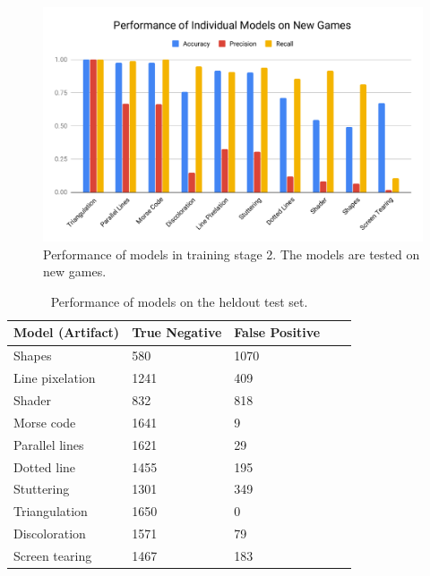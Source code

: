 \begin{figure}
    \centering
    \includegraphics[scale=0.7]{images/stage2fig.pdf}
    \caption[Performance of models in training stage 2]{Performance of models in training stage 2. The models are tested on new games.}
    \label{fig:stage2}
\end{figure}



\begin{table}
\centering
\begin{tabular}{@{}lllll@{}}
\toprule
Model (Artifact) & True Negative & False Positive  \\ \midrule
Shapes & 580 & 1070\\
Line pixelation & 1241 & 409\\
Shader & 832 & 818\\
Morse code & 1641 & 9\\
Parallel lines & 1621 & 29\\
Dotted line & 1455 & 195\\
Stuttering & 1301 & 349\\
Triangulation & 1650 & 0\\
Discoloration & 1571 & 79\\
Screen tearing & 1467 & 183\\\bottomrule
\end{tabular}
\caption{Performance of models on the heldout test set.}
\label{tab:test_models}
\end{table}

